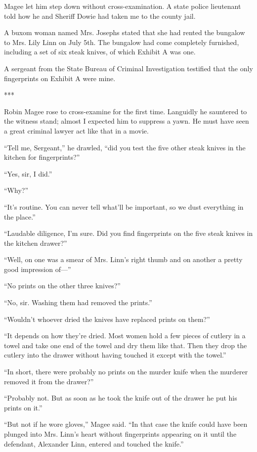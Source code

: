 {Magee let him step down without cross-examination. A state police lieutenant told how he and Sheriff Dowie had taken me to the county jail.

A buxom woman named Mrs. Josephs stated that she had rented the bungalow to Mrs. Lily Linn on July 5th. The bungalow had come completely furnished, including a set of six steak knives, of which Exhibit A was one.

A sergeant from the State Bureau of Criminal Investigation testified that the only fingerprints on Exhibit A were mine.

***

Robin Magee rose to cross-examine for the first time. Languidly he sauntered to the witness stand; almost I expected him to suppress a yawn. He must have seen a great criminal lawyer act like that in a movie.

“Tell me, Sergeant,” he drawled, “did you test the five other steak knives in the kitchen for fingerprints?”

“Yes, sir, I did.”

“Why?”

“It’s routine. You can never tell what’ll be important, so we dust everything in the place.”

“Laudable diligence, I’m sure. Did you find fingerprints on the five steak knives in the kitchen drawer?”

“Well, on one was a smear of Mrs. Linn’s right thumb and on another a pretty good impression of—”

“No prints on the other three knives?”

“No, sir. Washing them had removed the prints.”

“Wouldn’t whoever dried the knives have replaced prints on them?”

“It depends on how they’re dried. Most women hold a few pieces of cutlery in a towel and take one end of the towel and dry them like that. Then they drop the cutlery into the drawer without having touched it except with the towel.”

“In short, there were probably no prints on the murder knife when the murderer removed it from the drawer?”

“Probably not. But as soon as he took the knife out of the drawer he put his prints on it.”

“But not if he wore gloves,” Magee said. “In that case the knife could have been plunged into Mrs. Linn’s heart without fingerprints appearing on it until the defendant, Alexander Linn, entered and touched the knife.”

}
